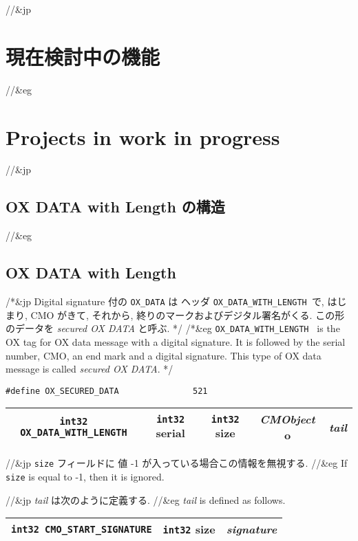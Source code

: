 //&jp \section{現在検討中の機能}
//&eg \section{Projects in work in progress}

//&jp \subsection{ OX DATA with Length の構造 }
//&eg \subsection{ OX DATA with Length }

/*&jp
Digital signature 付の {\tt OX\_DATA} は
ヘッダ {\tt OX\_DATA\_WITH\_LENGTH }で, はじまり, CMO がきて,
それから, 終りのマークおよびデジタル署名がくる.
この形のデータを {\it secured OX DATA} と呼ぶ.
*/
/*&eg
{\tt OX\_DATA\_WITH\_LENGTH } is the OX tag for 
OX data message with a digital signature.
It is followed by the serial number, CMO, an end mark and a digital signature.
This type of OX data message is called {\it secured OX DATA}.
*/

\begin{verbatim}
#define OX_SECURED_DATA               521
\end{verbatim}

\noindent
\begin{tabular}{|c|c|c|c|c|}  \hline
{\tt int32 OX\_DATA\_WITH\_LENGTH} & {\tt int32} {\rm serial} 
& {\tt int32} {\rm size}
& {\sl CMObject} {\rm o} & {\it tail} \\
\hline 
\end{tabular}

//&jp {\tt size} フィールドに 値 -1 が入っている場合この情報を無視する.
//&eg If {\tt size} is equal to -1, then it is ignored.

//&jp {\it tail } は次のように定義する.
//&eg {\it tail } is defined as follows.
\\ \noindent
\begin{tabular}{|c|c|c|}  \hline
{\tt int32 CMO\_START\_SIGNATURE} & {\tt int32} {\rm size}
& {\it signature} \\
\hline 
\end{tabular}

